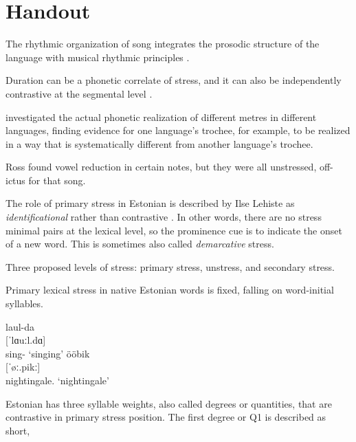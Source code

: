 \chapter{Handout}


The rhythmic organization of song integrates the prosodic structure of the language with musical rhythmic principles \citep{palmerLinguisticProsodyMusical1992}. 

Duration can be a phonetic correlate of stress, and it can also be independently contrastive at the segmental level \citep{lehistePhoneticsMetrics1992}. 







\citep{lehistePhoneticsMetrics1992} investigated the actual phonetic realization of different metres in different languages, finding evidence for one language's trochee, for example, to be realized in a way that is systematically different from another language's trochee. 

Ross found vowel reduction in certain notes, but they were all unstressed, off-ictus for that song\citep{rossFormants90}.


The role of primary stress in Estonian is described by Ilse Lehiste as {\it identificational} rather than contrastive \citep{lehistePhoneticsMetrics1992}. In other words, there are no stress minimal pairs at the lexical level, so the prominence cue is to indicate the onset of a new word. This is sometimes also called {\it demarcative} stress.



Three proposed levels of stress: primary stress, unstress, and secondary stress. \citep{lippusAcousticStudyEstonian2014a}

Primary lexical stress in native Estonian words is fixed, falling on word-initial syllables. 
\cite{eekmeisterUralica98}
\begin{exe}
\ex \gll laul-da \\
	{[ˈlɑuːl.dɑ]} \\
	sing-\Tr{} 
	\glt	`singing'
\ex 	ööbik \\
	{[ˈøː.pikː]} \\
	nightingale.\Nom{} 
	\glt`nightingale'
\end{exe}

Estonian has three syllable weights, also called degrees or quantities, that are contrastive in primary stress position. The first degree or Q1 is described as short, 

